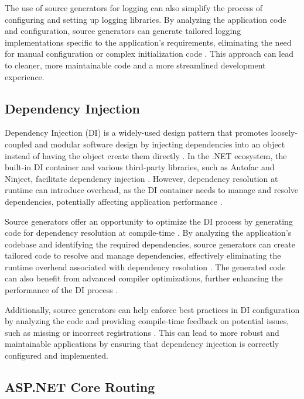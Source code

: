The use of source generators for logging can also simplify the process of configuring and setting up logging libraries. By analyzing the application code and configuration, source generators can generate tailored logging implementations specific to the application's requirements, eliminating the need for manual configuration or complex initialization code \cite{CSharpRoslyn}. This approach can lead to cleaner, more maintainable code and a more streamlined development experience.

\subsection{Dependency Injection}

Dependency Injection (DI) is a widely-used design pattern that promotes loosely-coupled and modular software design by injecting dependencies into an object instead of having the object create them directly \cite{Martin2003}. In the .NET ecosystem, the built-in DI container and various third-party libraries, such as Autofac and Ninject, facilitate dependency injection \cite{DIContainers}. However, dependency resolution at runtime can introduce overhead, as the DI container needs to manage and resolve dependencies, potentially affecting application performance \cite{Blumhardt2010}.

Source generators offer an opportunity to optimize the DI process by generating code for dependency resolution at compile-time \cite{CSharpRoslyn}. By analyzing the application's codebase and identifying the required dependencies, source generators can create tailored code to resolve and manage dependencies, effectively eliminating the runtime overhead associated with dependency resolution \cite{Carter2020}. The generated code can also benefit from advanced compiler optimizations, further enhancing the performance of the DI process \cite{Torgersen2020}.

Additionally, source generators can help enforce best practices in DI configuration by analyzing the code and providing compile-time feedback on potential issues, such as missing or incorrect registrations \cite{CSharpRoslyn}. This can lead to more robust and maintainable applications by ensuring that dependency injection is correctly configured and implemented.

\subsection{ASP.NET Core Routing}

